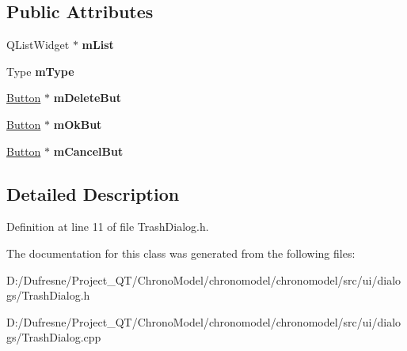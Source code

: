 \subsection*{Public Attributes}
\begin{DoxyCompactItemize}
\item 
\hypertarget{class_trash_dialog_ae803e09ddbf54168d0f3452638ff9cf1}{Q\-List\-Widget $\ast$ {\bfseries m\-List}}\label{class_trash_dialog_ae803e09ddbf54168d0f3452638ff9cf1}

\item 
\hypertarget{class_trash_dialog_a91ccf8bf19981473cebc5db805ee53f5}{Type {\bfseries m\-Type}}\label{class_trash_dialog_a91ccf8bf19981473cebc5db805ee53f5}

\item 
\hypertarget{class_trash_dialog_ae364f396b70ac9dc22be50b12c7f22d1}{\hyperlink{class_button}{Button} $\ast$ {\bfseries m\-Delete\-But}}\label{class_trash_dialog_ae364f396b70ac9dc22be50b12c7f22d1}

\item 
\hypertarget{class_trash_dialog_a5f3d7539a5385d4b98a8a31a3487a493}{\hyperlink{class_button}{Button} $\ast$ {\bfseries m\-Ok\-But}}\label{class_trash_dialog_a5f3d7539a5385d4b98a8a31a3487a493}

\item 
\hypertarget{class_trash_dialog_afcc9e23d1a747bb18b9a08b225e91977}{\hyperlink{class_button}{Button} $\ast$ {\bfseries m\-Cancel\-But}}\label{class_trash_dialog_afcc9e23d1a747bb18b9a08b225e91977}

\end{DoxyCompactItemize}


\subsection{Detailed Description}


Definition at line 11 of file Trash\-Dialog.\-h.



The documentation for this class was generated from the following files\-:\begin{DoxyCompactItemize}
\item 
D\-:/\-Dufresne/\-Project\-\_\-\-Q\-T/\-Chrono\-Model/chronomodel/chronomodel/src/ui/dialogs/Trash\-Dialog.\-h\item 
D\-:/\-Dufresne/\-Project\-\_\-\-Q\-T/\-Chrono\-Model/chronomodel/chronomodel/src/ui/dialogs/Trash\-Dialog.\-cpp\end{DoxyCompactItemize}
